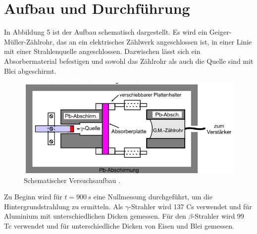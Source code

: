 \section{Aufbau und Durchführung}
\label{sec:Durchfuehrung}
In Abbildung 5 ist der Aufbau schematisch dargestellt. Es wird ein Geiger-Müller-Zählrohr, das an ein
elektrisches Zählwerk angeschlossen ist, in einer Linie mit einer Strahlenquelle angeschlossen. Dazwischen
lässt sich ein Absorbermaterial befestigen und sowohl das Zählrohr als auch die Quelle sind mit Blei abgeschirmt.
\begin{figure}
    \centering
    \label{fig:Aufbau}
    \includegraphics{Bilder/Aufbau.png}
    \caption{Schematischer Versuchsaufbau \cite{sample}.}
\end{figure}
Zu Beginn wird für $t=900\,\unit{s}$ eine Nullmessung durchgeführt, um die Hintergrundstrahlung zu ermitteln.
Als $\gamma$-Strahler wird 137 Cs verwendet und für Aluminium mit unterschiedlichen Dicken gemessen. Für den
$\beta$-Strahler wird 99 Tc verwendet und für unterschiedliche Dicken von Eisen und Blei gemessen.
